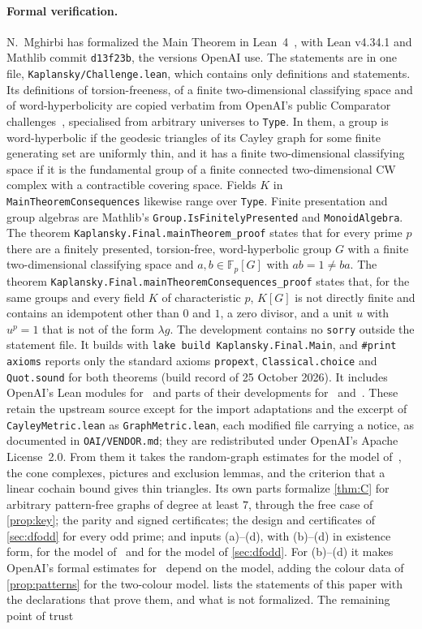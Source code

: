 \documentclass[11pt]{article}
\theoremstyle{definition}
\theoremstyle{plain}
\newcommand{\F}{\mathbb{F}}
\newcommand{\lean}[1]{\texttt{\small #1}}
\begin{document}
\paragraph{Formal verification.} N.~Mghirbi has formalized the Main Theorem in Lean~4~\cite{MghirbiLean}, with Lean v4.34.1 and Mathlib commit \texttt{d13f23b}, the versions OpenAI use. The statements are in one file, \texttt{Kaplansky/Challenge.lean}, which contains only definitions and statements. Its definitions of torsion-freeness, of a finite two-dimensional classifying space and of word-hyperbolicity are copied verbatim from OpenAI's public Comparator challenges~\cite{OAIlean}, specialised from arbitrary universes to \lean{Type}. In them, a group is word-hyperbolic if the geodesic triangles of its Cayley graph for some finite generating set are uniformly thin, and it has a finite two-dimensional classifying space if it is the fundamental group of a finite connected two-dimensional CW complex with a contractible covering space. Fields $K$ in \lean{MainTheoremConsequences} likewise range over \lean{Type}. Finite presentation and group algebras are Mathlib's \lean{Group.IsFinitelyPresented} and \lean{MonoidAlgebra}. The theorem \lean{Kaplansky.Final.mainTheorem\_proof} states that for every prime $p$ there are a finitely presented, torsion-free, word-hyperbolic group $G$ with a finite two-dimensional classifying space and $a,b\in\F_p[G]$ with $ab=1\neq ba$. The theorem \lean{Kaplansky.Final.mainTheoremConsequences\_proof} states that, for the same groups and every field $K$ of characteristic $p$, $K[G]$ is not directly finite and contains an idempotent other than $0$ and $1$, a zero divisor, and a unit $u$ with $u^p=1$ that is not of the form $\lambda g$. The development contains no \lean{sorry} outside the statement file. It builds with \lean{lake build Kaplansky.Final.Main}, and \lean{\#print axioms} reports only the standard axioms \lean{propext}, \lean{Classical.choice} and \lean{Quot.sound} for both theorems (build record of 25 October 2026). It includes OpenAI's Lean modules for~\cite{OAI196} and parts of their developments for~\cite{OAI252} and~\cite{OAI197d}. These retain the upstream source except for the import adaptations and the excerpt of \texttt{CayleyMetric.lean} as \texttt{GraphMetric.lean}, each modified file carrying a notice, as documented in \texttt{OAI/VENDOR.md}; they are redistributed under OpenAI's Apache License~2.0. From them it takes the random-graph estimates for the model of~\cite{OAI196}, the cone complexes, pictures and exclusion lemmas, and the criterion that a linear cochain bound gives thin triangles. Its own parts formalize \cref{thm:C} for arbitrary pattern-free graphs of degree at least $7$, through the free case of \cref{prop:key}; the parity and signed certificates; the design and certificates of \cref{sec:dfodd} for every odd prime; and inputs (a)--(d), with (b)--(d) in existence form, for the model of~\cite{OAI197a} and for the model of \cref{sec:dfodd}. For (b)--(d) it makes OpenAI's formal estimates for~\cite{OAI196} depend on the model, adding the colour data of \cref{prop:patterns} for the two-colour model.  lists the statements of this paper with the declarations that prove them, and what is not formalized. The remaining point of trust 
\end{document}
